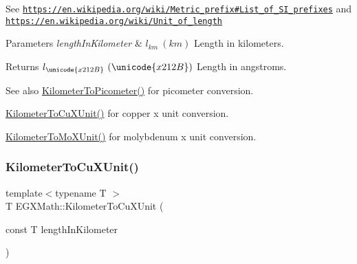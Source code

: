 See \href{https://en.wikipedia.org/wiki/Metric_prefix#List_of_SI_prefixes}{\tt https\+://en.\+wikipedia.\+org/wiki/\+Metric\+\_\+prefix\#\+List\+\_\+of\+\_\+\+S\+I\+\_\+prefixes} and \href{https://en.wikipedia.org/wiki/Unit_of_length}{\tt https\+://en.\+wikipedia.\+org/wiki/\+Unit\+\_\+of\+\_\+length} 
\begin{DoxyParams}{Parameters}
{\em length\+In\+Kilometer} & $ l_{km}\ (km)$ Length in kilometers. \\
\hline
\end{DoxyParams}
\begin{DoxyReturn}{Returns}
$ l_{\unicode{x212B}}\ (\unicode{x212B})$ Length in angstroms. 
\end{DoxyReturn}
\begin{DoxySeeAlso}{See also}
\mbox{\hyperlink{group___e_g_x_math-_conversions-_length_conversions-_s_i-_kilometer-_s_i_ga73f6e033de3c41892f06cde1862f68d6}{Kilometer\+To\+Picometer()}} for picometer conversion. 

\mbox{\hyperlink{group___e_g_x_math-_conversions-_length_conversions-_s_i-_kilometer-_non-_s_i_ga0614eb6a9e8bf1a9ba6cf51121f22083}{Kilometer\+To\+Cu\+X\+Unit()}} for copper x unit conversion. 

\mbox{\hyperlink{group___e_g_x_math-_conversions-_length_conversions-_s_i-_kilometer-_non-_s_i_ga547782594ebd0cc3e565f6d32f9528df}{Kilometer\+To\+Mo\+X\+Unit()}} for molybdenum x unit conversion. 
\end{DoxySeeAlso}
\mbox{\label{group___e_g_x_math-_conversions-_length_conversions-_s_i-_kilometer-_non-_s_i_ga0614eb6a9e8bf1a9ba6cf51121f22083}} 
\subsubsection{\texorpdfstring{Kilometer\+To\+Cu\+X\+Unit()}{KilometerToCuXUnit()}}
{\footnotesize\ttfamily template$<$typename T $>$ \\
T E\+G\+X\+Math\+::\+Kilometer\+To\+Cu\+X\+Unit (\begin{DoxyParamCaption}\item[{const T}]{length\+In\+Kilometer }\end{DoxyParamCaption})}



